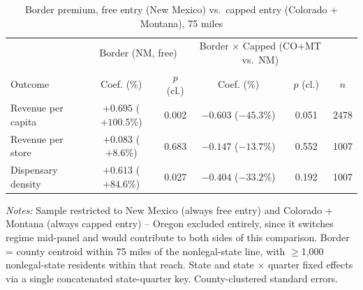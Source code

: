 \begin{table}[htbp]
\centering
\caption{Border premium, free entry (New Mexico) vs.\ capped entry (Colorado + Montana), 75 miles}
\label{tab:county_border_capped_nmcomt_75mi}
\footnotesize
\begin{tabular}{lccccc}
\toprule
& \multicolumn{2}{c}{Border (NM, free)} & \multicolumn{2}{c}{Border $\times$ Capped (CO+MT vs.\ NM)} & \\
Outcome & Coef. (\%) & $p$ (cl.) & Coef. (\%) & $p$ (cl.) & $n$ \\
\midrule
Revenue per capita & $+0.695$ ($+100.5\%$) & 0.002 & $-0.603$ ($-45.3\%$) & 0.051 & 2478 \\
Revenue per store & $+0.083$ ($+8.6\%$) & 0.683 & $-0.147$ ($-13.7\%$) & 0.552 & 1007 \\
Dispensary density & $+0.613$ ($+84.6\%$) & 0.027 & $-0.404$ ($-33.2\%$) & 0.192 & 1007 \\
\bottomrule
\end{tabular}
\begin{minipage}{0.98\textwidth}
\vspace{0.3em}
\footnotesize
\textit{Notes:} Sample restricted to New Mexico (always free entry) and Colorado + Montana (always capped
entry) -- Oregon excluded entirely, since it switches regime mid-panel and would contribute to both sides of
this comparison. Border = county centroid within 75 miles of the nonlegal-state line, with
$\geq$1,000 nonlegal-state residents within that reach. State and state $\times$ quarter fixed effects via a
single concatenated state-quarter key. County-clustered standard errors.
\end{minipage}
\end{table}
